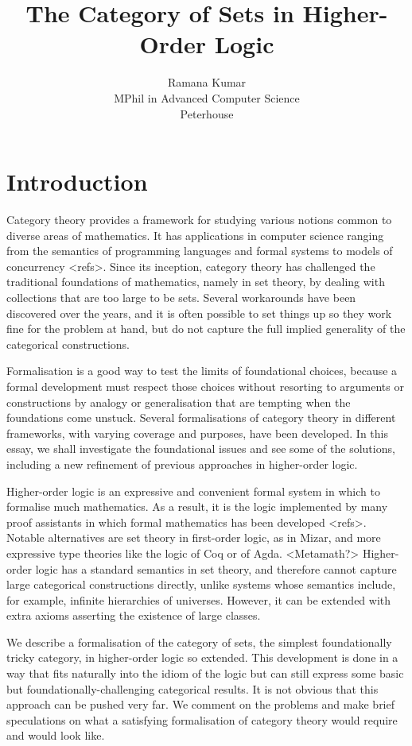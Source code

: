 \documentclass[twoside,titlepage,11pt]{article}
\title{The Category of Sets in Higher-Order Logic}
\author{Ramana Kumar\\MPhil in Advanced Computer Science\\Peterhouse}
\begin{document}
\maketitle
\section{Introduction}%
Category theory provides a framework for studying various notions common to diverse areas of mathematics.
It has applications in computer science ranging from the semantics of programming languages and formal systems to models of concurrency <refs>.
Since its inception, category theory has challenged the traditional foundations of mathematics, namely in set theory, by dealing with collections that are too large to be sets. 
Several workarounds have been discovered over the years, and it is often possible to set things up so they work fine for the problem at hand, but do not capture the full implied generality of the categorical constructions.

Formalisation is a good way to test the limits of foundational choices, because a formal development must respect those choices without resorting to arguments or constructions by analogy or generalisation that are tempting when the foundations come unstuck.
Several formalisations of category theory in different frameworks, with varying coverage and purposes, have been developed.
In this essay, we shall investigate the foundational issues and see some of the solutions, including a new refinement of previous approaches in higher-order logic.

Higher-order logic is an expressive and convenient formal system in which to formalise much mathematics.
As a result, it is the logic implemented by many proof assistants in which formal mathematics has been developed <refs>.
Notable alternatives are set theory in first-order logic, as in Mizar, and more expressive type theories like the logic of Coq or of Agda. <Metamath?>
Higher-order logic has a standard semantics in set theory, and therefore cannot capture large categorical constructions directly, unlike systems whose semantics include, for example, infinite hierarchies of universes.
However, it can be extended with extra axioms asserting the existence of large classes.

We describe a formalisation of the category of sets, the simplest foundationally tricky category, in higher-order logic so extended.
This development is done in a way that fits naturally into the idiom of the logic but can still express some basic but foundationally-challenging categorical results.
It is not obvious that this approach can be pushed very far.
We comment on the problems and make brief speculations on what a satisfying formalisation of category theory would require and would look like.
\end{document}
